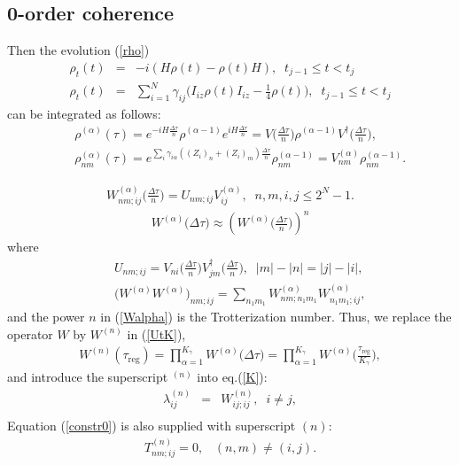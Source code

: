 \documentclass[pra,preprint,showpacs]{revtex4-1}
\begin{document}
{\subsection{0-order coherence}
Then the evolution (\ref{rho})
 \begin{eqnarray}\label{ev1}
 \rho_t(t)&=&-i (H\rho(t) - \rho(t) H) , \;\;t_{j-1}\le t < t_j\\\label{ev2}
   \rho_t(t)&=& \sum_{i=1}^N \gamma_{ij}\Big(I_{iz} \rho(t) I_{iz}
-\frac{1}{4} \rho(t) \Big), \;\;t_{j-1}\le t < t_j
\end{eqnarray}
can be integrated as follows:
\begin{eqnarray}
&&
\rho^{(\alpha)}(\tau) = e^{-iH \frac{\Delta \tau}{n}} \rho^{(\alpha-1)} e^{iH\frac{\Delta \tau}{n}  }= V \big(\frac{\Delta \tau}{n}\Big) \rho^{(\alpha-1)} V^\dagger \big(\frac{\Delta \tau}{n}\Big)  ,\\\nonumber
&&
\rho^{(\alpha)}_{nm}(\tau)=e^{\sum_{i} \gamma_{i\alpha} ((Z_i)_n  + (Z_i)_m)\frac{\Delta \tau}{n}}  \rho^{(\alpha-1)}_{nm} = V^{(\alpha)}_{nm} \rho^{(\alpha-1)}_{nm}.
\end{eqnarray}

\begin{eqnarray}\label{Walpha0}
W^{(\alpha)}_{nm;ij}\Big(\frac{\Delta \tau}{n}\Big)  = U_{nm;ij} V^{(\alpha)}_{ij}  ,\;\; n,m,i,j \le 2^N-1.
\end{eqnarray}
\begin{eqnarray}\label{Walpha}
W^{(\alpha)}\Big({\Delta \tau}\Big)  \approx \left(W^{(\alpha)} \Big(\frac{\Delta \tau}{n}\Big)   \right)^n
\end{eqnarray}
where
\begin{eqnarray}
&&
U_{nm;ij}=V_{ni}\big(\frac{\Delta \tau}{n}\Big) V^\dagger_{jm}\big(\frac{\Delta \tau}{n}\Big),\;\; |m|-|n|=|j|-|i|,\\\nonumber
&&
\Big(W^{(\alpha)} W^{(\alpha)} \Big)_{nm;ij}= \sum_{n_1m_1} W^{(\alpha)}_{nm;n_1m_1} W^{(\alpha)}_{n_1m_1;ij},
\end{eqnarray}
and the power $n$ in (\ref{Walpha}) is the Trotterization number. Thus, we replace the operator  $W$  by $W^{(n)}$ in (\ref{UtK}),
\begin{eqnarray}\label{Ktr2}
W^{(n)}(\tau_{\mathrm{reg}})=\prod_{\alpha=1}^{K_\gamma} W^{(\alpha)}\Big({\Delta\tau}\Big)=
\prod_{\alpha=1}^{K_\gamma} W^{(\alpha)} \Big(\frac{\tau_{\mathrm{reg}}}{K_\gamma }\Big),
\end{eqnarray}
and introduce the superscript $^{(n)}$ into eq.(\ref{K}):
\begin{eqnarray}\label{Kn}
\lambda^{(n)}_{ij} &=&W^{(n)}_{i j;ij},\;\; i\neq j,\\\label{K1n}
\end{eqnarray}
Equation (\ref{constr0}) is also supplied with superscript $(n)$:
\begin{eqnarray}\label{constr12}
T^{(n)}_{nm;ij}=0, \;\;\;(n,m)\neq (i,j).
\end{eqnarray}

}
\end{document}
